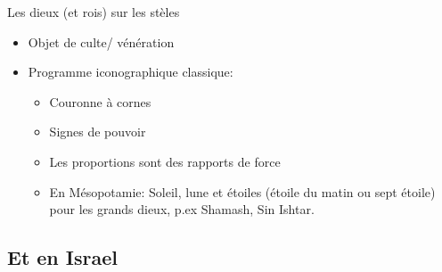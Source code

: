 \begin{parag}{Les dieux (et rois) sur les stèles}
    \begin{itemize}
        \item Objet de culte/ vénération
        \item Programme iconographique classique:
			\begin{itemize}
				\item Couronne à cornes
				\item Signes de pouvoir
				\item Les proportions sont des rapports de force
				\item En Mésopotamie: Soleil, lune et étoiles (étoile du matin ou sept étoile) pour les grands dieux, p.ex Shamash, Sin Ishtar.
			\end{itemize}
			
    \end{itemize}
    
\end{parag}



\subsection{Et en Israel}

